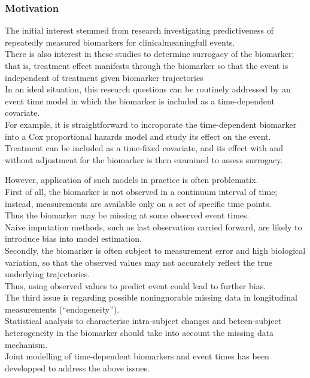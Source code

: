 \documentclass[11pt]{article} %
\begin{document}
\subsubsection{Motivation}
\par{
The initial interest stemmed from research investigating predictiveness of repeatedly measured biomarkers for clinicalmeaningfull events.\\
There is also interest in these studies to determine surrogacy of the biomarker; that is, treatment effect manifests through the biomarker so that the event is independent of treatment given biomarker trajectories\\

In an ideal situation, this research questions can be routinely addressed by an event time model in which the biomarker is included as a time-dependent covariate.\\
For example, it is straightforward to incroporate the time-dependent biomarker into a Cox proportional hazards model and study its effect on the event.\\
Treatment can be included as a time-fixed covariate, and its effect with and without adjustment for the biomarker is then examined to assess surrogacy.
}
\par{
However, application of such models in practice is often problematix.\\
First of all, the biomarker is not observed in a continuum interval of time; instead, measurements are available only on a set of specific time points.\\
Thus the biomarker may be missing at some observed event times.\\
Naive imputation methods, such as last observation carried forward, are likely to introduce bias into model estimation.\\
Secondly, the biomarker is often subject to measurement error and high biological variation, so that the observed values may not accurately reflect the true underlying trajectories.\\
Thus, using observed values to predict event could lead to further bias.\\
The third issue is regarding possible noningnorable missing data in longitudinal measurements (``endogeneity'').\\
Statistical analysis to characterise intra-subject changes and beteen-subject heterogeneity in the biomarker should take into account the missing data mechanism.\\

Joint modelling of time-dependent biomarkers and event times has been developped to address the above issues.
}
\end{document}
